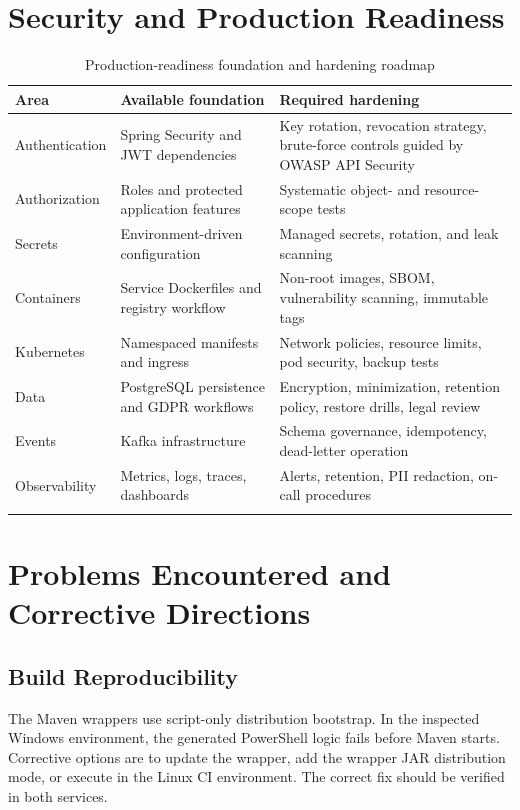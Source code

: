 \section{Security and Production Readiness}
\begin{longtable}{|P{3.4cm}|P{4.8cm}|P{5.2cm}|}
\hline
{}\textbf{Area} & \textbf{Available foundation} & \textbf{Required hardening}\\ \hline
Authentication & Spring Security and JWT dependencies & Key rotation, revocation strategy, brute-force controls guided by OWASP API Security~\cite{owaspApiSecurity}\\ \hline
Authorization & Roles and protected application features & Systematic object- and resource-scope tests~\cite{owaspApiSecurity}\\ \hline
Secrets & Environment-driven configuration & Managed secrets, rotation, and leak scanning\\ \hline
Containers & Service Dockerfiles and registry workflow & Non-root images, SBOM, vulnerability scanning, immutable tags\\ \hline
Kubernetes & Namespaced manifests and ingress & Network policies, resource limits, pod security, backup tests\\ \hline
Data & PostgreSQL persistence and GDPR workflows & Encryption, minimization, retention policy, restore drills, legal review~\cite{gdpr}\\ \hline
Events & Kafka infrastructure & Schema governance, idempotency, dead-letter operation\\ \hline
Observability & Metrics, logs, traces, dashboards & Alerts, retention, PII redaction, on-call procedures\\ \hline
\caption{Production-readiness foundation and hardening roadmap}
\label{tab:readiness}
\end{longtable}

\section{Problems Encountered and Corrective Directions}
\subsection{Build Reproducibility}
The Maven wrappers use script-only distribution bootstrap. In the inspected Windows environment, the generated PowerShell logic fails before Maven starts. Corrective options are to update the wrapper, add the wrapper JAR distribution mode, or execute in the Linux CI environment. The correct fix should be verified in both services.

